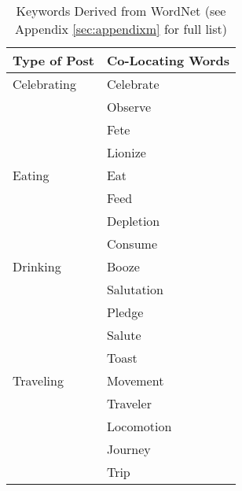 \clearpage
\begin{table}[ph!]   %
	\centering
	\caption{Keywords Derived from WordNet (see Appendix \ref{sec:appendixm} for full list)} \vspace{0.25em}
	\begin{tabular}{|p{1.5in}|p{2in}|} \hline
		\centering Type of Post & Co-Locating Words \\ \hline
		Celebrating 
			& Celebrate \\
			& Observe\\
			& Fete\\
			& Lionize
		\\ \hline
		Eating 
			& Eat\\
			& Feed\\
			& Depletion\\
			& Consume 
		 \\ \hline
		Drinking 
			& Booze\\
			& Salutation\\
			& Pledge\\
			& Salute\\
			& Toast
		 \\ \hline
		Traveling
			& Movement\\
			& Traveler\\
			& Locomotion\\
			& Journey\\
			& Trip\\\hline
	\end{tabular}
	\label{tab:EventClassificationWordNet}
\end{table}
\clearpage
